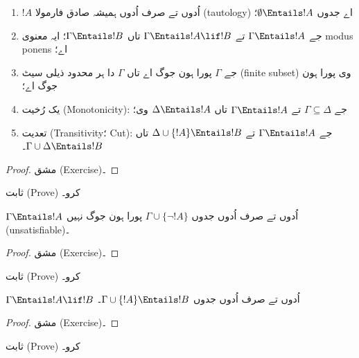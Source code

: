 \documentclass[../../../include/open-logic-section]{subfiles}
\begin{document}
\begin{prop}
\begin{enumerate}
\item $!A$ اُدوں تے صرف اُدوں ہمیشہ صادق فارمولا (tautology) اے جدوں
  $\emptyset \Entails !A$؛
\item جے $\Gamma \Entails !A$ تے $\Gamma \Entails !A \lif !B$ تاں
  $\Gamma \Entails !B$؛ ایہ معنوی modus ponens اے؛
\item جے $\Gamma$ پورا ہون جوگ اے تاں $\Gamma$ دا ہر محدود ذیلی سیٹ
  (finite subset) وی
  پورا ہون جوگ اے؛
\item {} یک رُخیت (Monotonicity): جے $\Gamma \subseteq \Delta$
  تے $\Gamma \Entails !A$ تاں $\Delta \Entails !A$ وی؛
\item {} تعدیت (Transitivity؛ Cut): جے $\Gamma \Entails !A$ تے
  $\Delta \cup \{ !A\} \Entails !B$ تاں $\Gamma \cup \Delta \Entails
  !B$۔
\end{enumerate}
\end{prop}

\begin{proof}
مشق (Exercise)۔
\end{proof}

\begin{prob}
 ثابت (Prove) کرو۔
\end{prob}

\begin{prop}
  $\Gamma \Entails !A$ اُدوں تے صرف اُدوں جدوں
  $\Gamma \cup \{\lnot !A\}$ پورا ہون جوگ نہیں (unsatisfiable)۔
\end{prop}

\begin{proof}
مشق (Exercise)۔
\end{proof}

\begin{prob}
 ثابت (Prove) کرو۔
\end{prob}

\begin{thm}
   $\Gamma \Entails !A \lif !B$ اُدوں تے صرف
  اُدوں جدوں $\Gamma \cup \{!A\} \Entails !B$۔
\end{thm}

\begin{proof}
مشق (Exercise)۔
\end{proof}

\begin{prob}
 ثابت (Prove) کرو۔
\end{prob}
\end{document}
